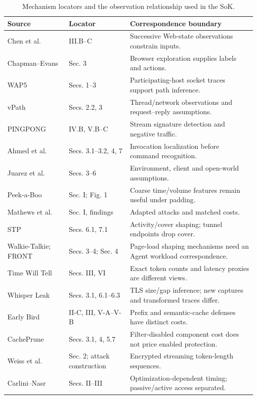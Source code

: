 \begin{table}[t]\centering\small
\caption{Mechanism locators and the observation relationship used in the SoK.}
\label{tab:mature-locators}
\begin{tabularx}{\textwidth}{@{}P{.27\textwidth}P{.22\textwidth}Y@{}}\toprule
Source & Locator & Correspondence boundary \\\midrule
Chen et al.~\cite{chen2010web} & III.B--C & Successive Web-state observations constrain inputs. \\
Chapman--Evans~\cite{chapman2011blackbox} & Sec. 3 & Browser exploration supplies labels and actions. \\
WAP5~\cite{reynolds2006wap5} & Secs. 1--3 & Participating-host socket traces support path inference. \\
vPath~\cite{tak2009vpath} & Secs. 2.2, 3 & Thread/network observations and request--reply assumptions. \\
PINGPONG~\cite{trimananda2020pingpong} & IV.B, V.B--C & Stream signature detection and negative traffic. \\
Ahmed et al.~\cite{ahmed2023voice} & Secs. 3.1--3.2, 4, 7 & Invocation localization before command recognition. \\
Juarez et al.~\cite{juarez2014critical} & Secs. 3--6 & Environment, client and open-world assumptions. \\
Peek-a-Boo~\cite{dyer2012peekaboo} & Sec. I; Fig. 1 & Coarse time/volume features remain useful under padding. \\
Mathews et al.~\cite{mathews2023critical} & Sec. I, findings & Adapted attacks and matched costs. \\
STP~\cite{apthorpe2019stp} & Secs. 6.1, 7.1 & Activity/cover shaping; tunnel endpoints drop cover. \\
Walkie-Talkie; FRONT~\cite{wang2017walkietalkie,gong2020front} & Secs. 3--4; Sec. 4 & Page-load shaping mechanisms need an Agent workload correspondence. \\
Time Will Tell~\cite{timewilltell2024} & Secs. III, VI & Exact token counts and latency proxies are different views. \\
Whisper Leak~\cite{whisperleak2025} & Secs. 3.1, 6.1--6.3 & TLS size/gap inference; new captures and transformed traces differ. \\
Early Bird~\cite{earlybird2025} & II-C, III, V-A--V-B & Prefix and semantic-cache defenses have distinct costs. \\
CachePrune~\cite{wu2026cacheprune} & Secs. 3.1, 4, 5.7 & Filter-disabled component cost does not price enabled protection. \\
Weiss et al.~\cite{weiss2024prompt} & Sec. 2; attack construction & Encrypted streaming token-length sequences. \\
Carlini--Nasr~\cite{carlini2024timing} & Secs. II--III & Optimization-dependent timing; passive/active access separated. \\\bottomrule
\end{tabularx}\end{table}

